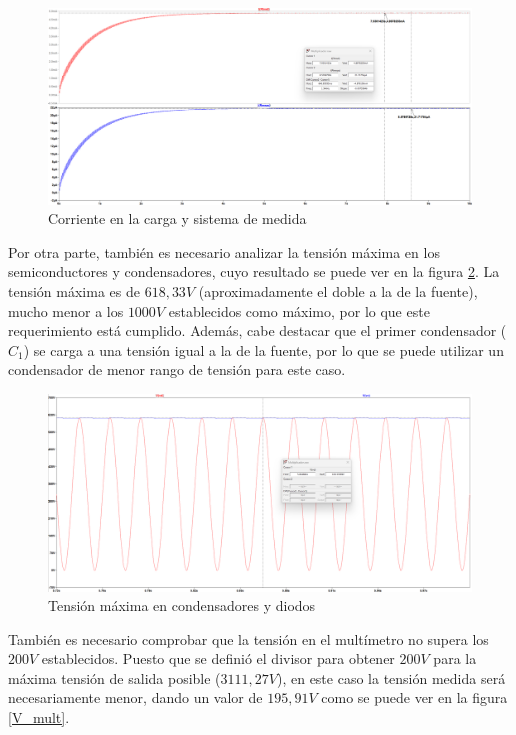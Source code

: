 \begin{figure}[H]
    \centering
    \includegraphics[width=1\textwidth]{Imagenes_alvaro/Corrientes.png}
    \caption{Corriente en la carga y sistema de medida}
    \label{Corrientes}
\end{figure}

Por otra parte, también es necesario analizar la tensión máxima en los semiconductores y condensadores, cuyo resultado se puede ver en la figura \ref{Vmax}.
La tensión máxima es de $618,33V$ (aproximadamente el doble a la de la fuente), mucho menor a los $1000V$ 
establecidos como máximo, por lo que este requerimiento está cumplido. Además, cabe destacar que el primer 
condensador ($C_1$) se carga a una tensión igual a la de la fuente, por lo que se puede utilizar un condensador de menor rango de tensión para este caso.

\begin{figure}[H]
    \centering
    \includegraphics[width=1\textwidth]{Imagenes_alvaro/Vmax.png}
    \caption{Tensión máxima en condensadores y diodos}
    \label{Vmax}
\end{figure}

También es necesario comprobar que la tensión en el multímetro no supera los $200V$ establecidos. Puesto que se definió el divisor para obtener $200V$
para la máxima tensión de salida posible ($3111,27V$), en este caso la tensión medida será necesariamente menor, dando un valor de $195,91V$ como se puede ver en la figura
\ref{V_mult}.

